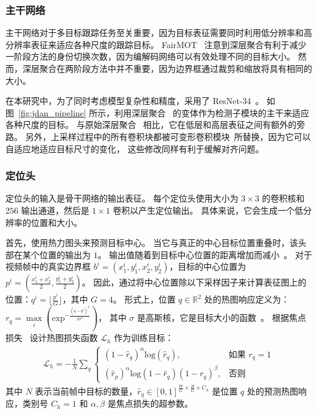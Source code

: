 \subsubsection{主干网络}
\label{sec:backbone}
主干网络对于多目标跟踪任务至关重要，因为目标表征需要同时利用低分辨率和高分辨率表征来适应各种尺度的跟踪目标。
FairMOT~\cite{fairmot} 注意到深层聚合有利于减少一阶段方法的身份切换次数，因为编解码网络可以有效处理不同的目标大小。
然而，深层聚合在两阶段方法中并不重要，因为边界框通过裁剪和缩放将具有相同的大小。

在本研究中，为了同时考虑模型复杂性和精度，采用了 ResNet-34~\cite{resnet}。
如图~\ref{fig:jdan_pipeline} 所示，利用深层聚合~\cite{point} 的变体作为检测子模块的主干来适应各种尺度的目标。
与原始深层聚合~\cite{dla} 相比，它在低层和高层表征之间有额外的旁路。
另外，上采样过程中的所有卷积块都被可变形卷积模块~\cite{deformable}所替换，因为它可以自适应地适应目标尺寸的变化，
这些修改同样有利于缓解对齐问题。


\subsubsection{定位头}
\label{sec:detection_head}
定位头的输入是骨干网络的输出表征。
每个定位头使用大小为 $3\times3$ 的卷积核和 $256$ 输出通道，然后是 $1\times1$ 卷积以产生定位输出。
具体来说，它会生成一个低分辨率的位置和大小。

首先，使用热力图头来预测目标中心。
当它与真正的中心目标位置重叠时，该头部在某个位置的输出为 $1$。
输出值随着到目标中心位置的距离增加而减小~\cite{cornernet}。
对于视频帧中的真实边界框 $b^i = (x_1^i,y_1^i,x_2^i,y_2^i)$，目标的中心位置为
$ p^i = (\frac{x_1^i+x_2^i}{2}, \frac{y_1^i+y_2^i}{2})$。
因此，通过将中心位置除以下采样因子来计算表征图上的位置：$q^i = \lfloor \frac{p^i}{G} \rfloor $，其中 $G=4$。
形式上，位置 $q \in \mathbb{R}^2$ 处的热图响应定义为：
$r_{q} = \mathop{max}\limits_{i} ( \mathrm{exp}^{-\frac{(q - q^i)^2}{2\sigma ^2}} ) $，
其中 $\sigma$ 是高斯核，它是目标大小的函数~\cite{cornernet}。
根据焦点损失~\cite{lin2017focal} 设计热图损失函数 $ \mathcal{L}_{h} $ 作为训练目标：
\begin{align}
\mathcal{L}_{h} = -\frac{1}{N} \sum _{q} \begin{cases} (1-\hat{r}_{q})^\alpha \text{log}(\hat{r}_{q}), & \text{如果 } r_{q}=1 \\ (\hat{r}_{p})^\alpha \text{log}(1-\hat{r}_{q}) (1-r_{q})^\beta, & \text{否则}
\end{cases}
\end{align}
其中 $N$ 表示当前帧中目标的数量，$\hat{r}_{q} \in [0,1]^{\frac{W}{G} \times \frac{H}{ G} \times C_h}$ 是位置 $q$ 处的预测热图响应，类别号 $C_h=1$ 和 $\alpha, \beta$ 是焦点损失的超参数。

